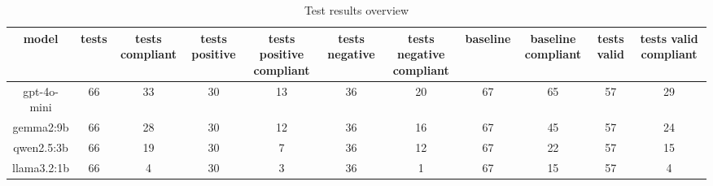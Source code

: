 
  \begin{table}[h!]
  \centering
  \begin{tabular}{|c|c|c|c|c|c|c|c|c|c|c|}
  \hline
  model & tests & tests compliant & tests positive & tests positive compliant & tests negative & tests negative compliant & baseline & baseline compliant & tests valid & tests valid compliant \\
  \hline
  gpt-4o-mini & 66 & 33 & 30 & 13 & 36 & 20 & 67 & 65 & 57 & 29\\
\hline
gemma2:9b & 66 & 28 & 30 & 12 & 36 & 16 & 67 & 45 & 57 & 24\\
\hline
qwen2.5:3b & 66 & 19 & 30 & 7 & 36 & 12 & 67 & 22 & 57 & 15\\
\hline
llama3.2:1b & 66 & 4 & 30 & 3 & 36 & 1 & 67 & 15 & 57 & 4
  \end{tabular}
  \caption{Test results overview}
  
  \end{table}
  